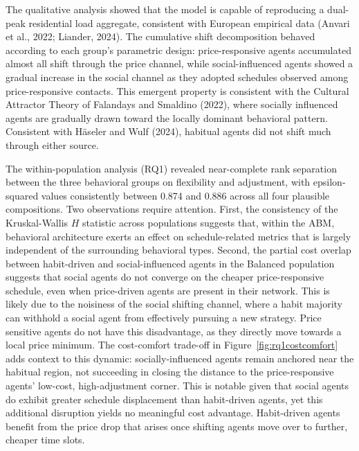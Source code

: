 \documentclass[11pt, a4paper]{article}
\begin{document}
The qualitative analysis showed that the model is capable of reproducing a dual-peak residential load aggregate, consistent with European empirical data (Anvari et al., 2022; Liander, 2024). The cumulative shift decomposition behaved according to each group's parametric design: price-responsive agents accumulated almost all shift through the price channel, while social-influenced agents showed a gradual increase in the social channel as they adopted schedules observed among price-responsive contacts. This emergent property is consistent with the Cultural Attractor Theory of Falandays and Smaldino (2022), where socially influenced agents are gradually drawn toward the locally dominant behavioral pattern. Consistent with Häseler and Wulf (2024), habitual agents did not shift much through either source. 

The within-population analysis (RQ1) revealed near-complete rank separation between the three behavioral groups on flexibility and adjustment, with epsilon-squared values consistently between 0.874 and 0.886 across all four plausible compositions. Two observations require attention. First, the consistency of the Kruskal-Wallis $H$ statistic across populations suggests that, within the ABM, behavioral architecture exerts an effect on schedule-related metrics that is largely independent of the surrounding behavioral types. Second, the partial cost overlap between habit-driven and social-influenced agents in the Balanced population suggests that social agents do not converge on the cheaper price-responsive schedule, even when price-driven agents are present in their network. This is likely due to the noisiness of the social shifting channel, where a habit majority can withhold a social agent from effectively pursuing a new strategy. Price sensitive agents do not have this disadvantage, as they directly move towards a local price minimum. The cost-comfort trade-off in Figure~\ref{fig:rq1costcomfort} adds context to this dynamic: socially-influenced agents remain anchored near the habitual region, not succeeding in closing the distance to the price-responsive agents' low-cost, high-adjustment corner. This is notable given that social agents do exhibit greater schedule displacement than habit-driven agents, yet this additional disruption yields no meaningful cost advantage. Habit-driven agents benefit from the price drop that arises once shifting agents move over to further, cheaper time slots.
\end{document}
